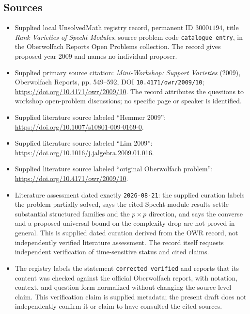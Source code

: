 \documentclass[11pt]{article}
\begin{document}
\subsection{Sources}
\begin{itemize}
\item Supplied local UnsolvedMath registry record, permanent ID \(30001194\), title \emph{Rank Varieties of Specht Modules}, source problem code \texttt{catalogue entry}, in the Oberwolfach Reports Open Problems collection. The record gives proposed year 2009 and names no individual proposer.
\item Supplied primary source citation: \emph{Mini-Workshop: Support Varieties} (2009), Oberwolfach Reports, pp. 549--592, DOI \texttt{10.4171/owr/2009/10}; \url{https://doi.org/10.4171/owr/2009/10}. The record attributes the questions to workshop open-problem discussions; no specific page or speaker is identified.
\item Supplied literature source labeled ``Hemmer 2009'': \url{https://doi.org/10.1007/s10801-009-0169-0}.
\item Supplied literature source labeled ``Lim 2009'': \url{https://doi.org/10.1016/j.jalgebra.2009.01.016}.
\item Supplied literature source labeled ``original Oberwolfach problem'': \url{https://doi.org/10.4171/owr/2009/10}.
\item Literature assessment dated exactly \texttt{2026-08-21}: the supplied curation labels the problem partially solved, says the cited Specht-module results settle substantial structured families and the \(p\times p\) direction, and says the converse and a proposed universal bound on the complexity drop are not proved in general. This is supplied dated curation derived from the OWR record, not independently verified literature assessment. The record itself requests independent verification of time-sensitive status and cited claims.
\item The registry labels the statement \texttt{corrected\_verified} and reports that its content was checked against the official Oberwolfach report, with notation, context, and question form normalized without changing the source-level claim. This verification claim is supplied metadata; the present draft does not independently confirm it or claim to have consulted the cited sources.
\end{itemize}
\end{document}
